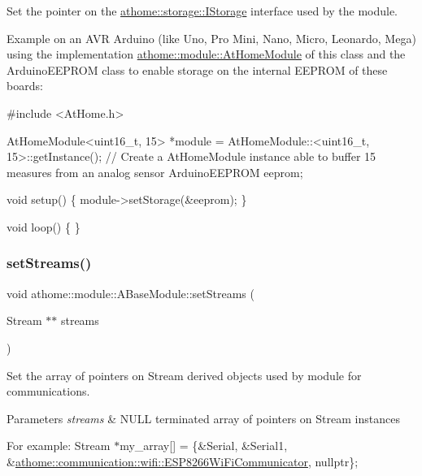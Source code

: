 Set the pointer on the \mbox{\hyperlink{classathome_1_1storage_1_1_i_storage}{athome\+::storage\+::\+I\+Storage}} interface used by the module.

Example on an A\+VR Arduino (like Uno, Pro Mini, Nano, Micro, Leonardo, Mega) using the implementation \mbox{\hyperlink{classathome_1_1module_1_1_at_home_module}{athome\+::module\+::\+At\+Home\+Module}} of this class and the Arduino\+E\+E\+P\+R\+OM class to enable storage on the internal E\+E\+P\+R\+OM of these boards\+:


\begin{DoxyCode}
\textcolor{preprocessor}{#include <AtHome.h>}

AtHomeModule<uint16\_t, 15> *module = AtHomeModule::<uint16\_t, 15>::getInstance(); \textcolor{comment}{// Create a AtHomeModule
       instance able to buffer 15 measures from an analog sensor}
ArduinoEEPROM eeprom;

\textcolor{keywordtype}{void} setup() \{
  module->setStorage(&eeprom);
\}

\textcolor{keywordtype}{void} loop() \{
\}
\end{DoxyCode}
 \mbox{\label{classathome_1_1module_1_1_a_base_module_af1af8e6110a8d0baee15efb2275ae5ae}} 
\subsubsection{\texorpdfstring{set\+Streams()}{setStreams()}}
{\footnotesize\ttfamily void athome\+::module\+::\+A\+Base\+Module\+::set\+Streams (\begin{DoxyParamCaption}\item[{Stream $\ast$$\ast$}]{streams }\end{DoxyParamCaption})}

Set the array of pointers on Stream derived objects used by module for communications.


\begin{DoxyParams}{Parameters}
{\em streams} & N\+U\+LL terminated array of pointers on Stream instances\\
\hline
\end{DoxyParams}
For example\+: {\ttfamily Stream $\ast$my\+\_\+array\mbox{[}\mbox{]} = \{\&Serial, \&Serial1, \&\mbox{\hyperlink{classathome_1_1communication_1_1wifi_1_1_e_s_p8266_wi_fi_communicator}{athome\+::communication\+::wifi\+::\+E\+S\+P8266\+Wi\+Fi\+Communicator}}, nullptr\};}

